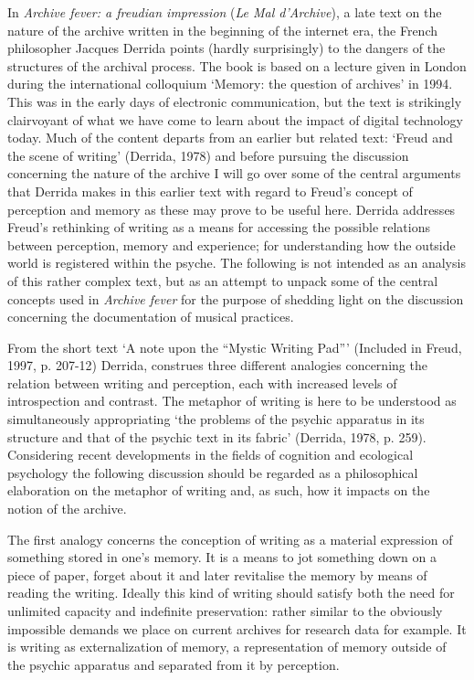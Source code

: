 In \emph{Archive fever: a freudian impression} (\emph{Le Mal
d'Archive}), a late text on the nature of the archive written in the
beginning of the internet era, the French philosopher Jacques Derrida
points (hardly surprisingly) to the dangers of the structures of the
archival process. The book is based on a lecture given in London during
the international colloquium `Memory: the question of archives' in 1994.
This was in the early days of electronic communication, but the text is
strikingly clairvoyant of what we have come to learn about the impact of
digital technology today. Much of the content departs from an earlier
but related text: `Freud and the scene of writing' (Derrida, 1978) and
before pursuing the discussion concerning the nature of the archive I
will go over some of the central arguments that Derrida makes in this
earlier text with regard to Freud's concept of perception and memory as
these may prove to be useful here. Derrida addresses Freud's rethinking
of writing as a means for accessing the possible relations between
perception, memory and experience; for understanding how the outside
world is registered within the psyche. The following is not intended as
an analysis of this rather complex text, but as an attempt to unpack
some of the central concepts used in \emph{Archive fever} for the
purpose of shedding light on the discussion concerning the documentation
of musical practices.

From the short text `A note upon the ``Mystic Writing Pad''' (Included
in Freud, 1997, p. 207-12) Derrida, construes three different analogies
concerning the relation between writing and perception, each with
increased levels of introspection and contrast. The metaphor of writing
is here to be understood as simultaneously appropriating `the problems
of the psychic apparatus in its structure and that of the psychic text
in its fabric' (Derrida, 1978, p. 259). Considering recent developments
in the fields of cognition and ecological psychology the following
discussion should be regarded as a philosophical elaboration on the
metaphor of writing and, as such, how it impacts on the notion of the
archive.

The first analogy concerns the conception of writing as a material
expression of something stored in one's memory. It is a means to jot
something down on a piece of paper, forget about it and later revitalise
the memory by means of reading the writing. Ideally this kind of writing
should satisfy both the need for unlimited capacity and indefinite
preservation: rather similar to the obviously impossible demands we
place on current archives for research data for example. It is writing
as externalization of memory, a representation of memory outside of the
psychic apparatus and separated from it by perception.

